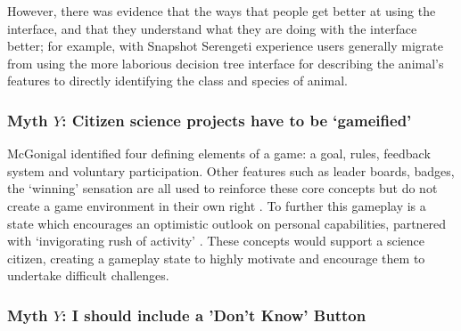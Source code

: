 \documentclass{sigchi}
\begin{document}
However, there was evidence that the ways that people get better at using the interface, and that they understand what they are doing with the interface better; for example, with Snapshot Serengeti experience users generally migrate from using the more laborious decision tree interface for describing the animal's features to directly identifying the class and species of animal.

\subsubsection{Myth $Y$: Citizen science projects have to be `gameified'}
McGonigal identified four defining elements of a game: a goal, rules, feedback system and voluntary participation. Other features such as leader boards, badges, the `winning' sensation are all used to reinforce these core concepts but do not create a game environment in their own right \cite{mcgonigal2011reality}. To further this gameplay is a state which encourages an optimistic outlook on personal capabilities, partnered with `invigorating rush of activity' \cite{mcgonigal2011reality}. These concepts would support a science citizen, creating a gameplay state to highly motivate and encourage them to undertake difficult challenges. 


\subsubsection{Myth $Y$: I should include a 'Don't Know' Button}
\end{document}
